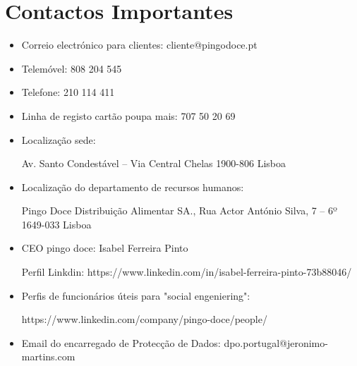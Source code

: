 \section{Contactos Importantes}
\begin{itemize}
\item Correio electrónico para clientes: cliente@pingodoce.pt\newline


\item Telemóvel: 808 204 545 \newline


\item Telefone:    210 114 411\newline


\item Linha de registo cartão poupa mais: 707 50 20 69\newline

\item Localização sede:\newline


\par Av. Santo Condestável – Via Central Chelas 1900-806 Lisboa\newline


\item Localização do departamento de recursos humanos: \newline


\par Pingo Doce Distribuição Alimentar SA., Rua Actor António Silva, 7 – 6º 1649-033 Lisboa \newline

\item CEO pingo doce: Isabel Ferreira Pinto\newline

\par Perfil Linkdin: https://www.linkedin.com/in/isabel-ferreira-pinto-73b88046/

\item Perfis de funcionários úteis para "social engeniering":\newline

\par https://www.linkedin.com/company/pingo-doce/people/

\item Email do encarregado de Protecção de Dados:  dpo.portugal@jeronimo-martins.com \newline
\end{itemize}



